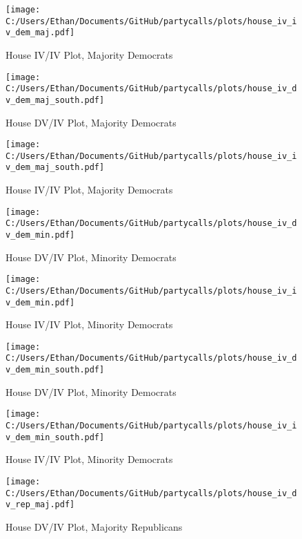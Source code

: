 \documentclass[12pt]{article}
\begin{document}
\begin{figure}[H]
	\centering
	\caption{House IV/IV Plot, Majority Democrats}
	\texttt{[image: C:/Users/Ethan/Documents/GitHub/partycalls/plots/house\_iv\_iv\_dem\_maj.pdf]}
\end{figure}

\begin{figure}[H]
	\centering
	\caption{House DV/IV Plot, Majority Democrats}
	\texttt{[image: C:/Users/Ethan/Documents/GitHub/partycalls/plots/house\_iv\_dv\_dem\_maj\_south.pdf]}
\end{figure}

\begin{figure}[H]
	\centering
	\caption{House IV/IV Plot, Majority Democrats}
	\texttt{[image: C:/Users/Ethan/Documents/GitHub/partycalls/plots/house\_iv\_iv\_dem\_maj\_south.pdf]}
\end{figure}

\begin{figure}[H]
	\centering
	\caption{House DV/IV Plot, Minority Democrats}
	\texttt{[image: C:/Users/Ethan/Documents/GitHub/partycalls/plots/house\_iv\_dv\_dem\_min.pdf]}
\end{figure}

\begin{figure}[H]
	\centering
	\caption{House IV/IV Plot, Minority Democrats}
	\texttt{[image: C:/Users/Ethan/Documents/GitHub/partycalls/plots/house\_iv\_iv\_dem\_min.pdf]}
\end{figure}

\begin{figure}[H]
	\centering
	\caption{House DV/IV Plot, Minority Democrats}
	\texttt{[image: C:/Users/Ethan/Documents/GitHub/partycalls/plots/house\_iv\_dv\_dem\_min\_south.pdf]}
\end{figure}

\begin{figure}[H]
	\centering
	\caption{House IV/IV Plot, Minority Democrats}
	\texttt{[image: C:/Users/Ethan/Documents/GitHub/partycalls/plots/house\_iv\_iv\_dem\_min\_south.pdf]}
\end{figure}

\begin{figure}[H]
	\centering
	\caption{House DV/IV Plot, Majority Republicans}
	\texttt{[image: C:/Users/Ethan/Documents/GitHub/partycalls/plots/house\_iv\_dv\_rep\_maj.pdf]}
\end{figure}
\end{document}
